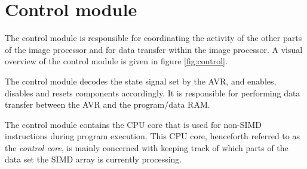 \section{Control module}

The control module is responsible for coordinating the activity of the
other parts of the image processor and for data transfer within the
image processor. A visual overview of the control module is given in
figure \ref{fig:control}.

The control module decodes the state signal set by the AVR, and enables,
disables and resets components accordingly. It is responsible for
performing data transfer between the AVR and the program/data RAM.

The control module contains the CPU core that is used for non-SIMD
instructions during program execution. This CPU core, henceforth
referred to as the \emph{control core}, is mainly concerned with keeping
track of which parts of the data set the SIMD array is currently
processing.
